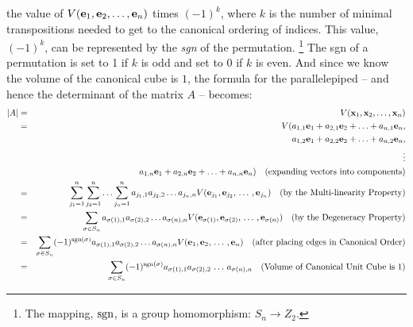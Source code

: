 \documentclass{article}
\begin{document}
the value of $V({\bf e}_1, {\bf e}_2, \ldots, {\bf e}_n)$ times $(-1)^k$, where
$k$ is the number of minimal transpositions needed to get to the canonical ordering of
indices. This value, $(-1)^k$, can be represented by the {\em sgn\/}
of the permutation.%
\footnote{The mapping, ${\rm sgn\/}$, is a group homomorphism: $S_n \rightarrow Z_2$.}
The sgn of a permutation is set to 1 if $k$ is odd and set to 0
if $k$ is even. And since we know the volume of the canonical cube is $1$,
the formula for the parallelepiped -- and hence the
determinant of the matrix $A$ -- becomes:
\begin{eqnarray}
  |A| & = & V({\bf x}_1, {\bf x}_2, \ldots, {\bf x}_n) \nonumber \\
  & = & V(a_{1, 1} {\bf e}_1 + a_{2, 1} {\bf e}_2 + \ldots + a_{n,1}{\bf e}_n, \nonumber \\
      & \hphantom{=} & \hphantom{V(}a_{1, 2} {\bf e}_1 + a_{2, 2} {\bf e}_2
                       + \ldots + a_{n,2}{\bf e}_n, \nonumber \\
      & \hphantom{=} & \hphantom{V(} \vdots \nonumber \\
      & \hphantom{=} & \hphantom{V(} a_{1, n} {\bf e}_1 + a_{2, n} {\bf e}_2
                       + \ldots + a_{n,n}{\bf e}_n)
                       \nonumber \quad
                       \text{(expanding vectors into components)} \nonumber \\   
      & = & \sum_{j_1=1}^n \sum_{j_2=1}^n \ldots \sum_{j_n=1}^n 
            a_{j_1,1} a_{j_2, 2} \ldots a_{j_n, n}
            V({\bf e}_{j_1}, {\bf e}_{j_2}, \, \ldots \, , {\bf e}_{j_n}) 
            \quad \text{(by the Multi-linearity Property)} \nonumber \\
  & = & \sum_{\sigma \in S_n} a_{\sigma(1), 1} a_{\sigma(2),2} \ldots a_{\sigma(n), n}
        V({\bf e}_{\sigma(1)}, {\bf e}_{\sigma(2)}, \, \ldots \, , {\bf e}_{\sigma(n)})
        \quad \text{(by the Degeneracy Property)} \nonumber \\
      & = & \sum_{\sigma \in S_n} (-1)^{{\rm sgn}(\sigma)}
            a_{\sigma(1), 1} a_{\sigma(2),2} \ldots a_{\sigma(n), n}
        V({\bf e}_{1}, {\bf e}_{2}, \, \ldots \, , {\bf e}_{n})
        \quad \text{(after placing edges in Canonical Order)}\nonumber \\
      & = & \sum_{\sigma \in S_n} (-1)^{{\rm sgn}(\sigma)}
            a_{\sigma(1), 1} a_{\sigma(2),2} \, \ldots \, a_{\sigma(n), n} \quad
        \text{(Volume of Canonical Unit Cube is $1$)}
\end{eqnarray}
\end{document}
